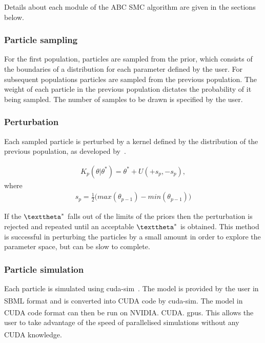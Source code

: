 \noindent Details about each module of the ABC SMC algorithm are given in the sections below. 


\subsubsection{Particle sampling}
\label{sec:part_samp}
For the first population, particles are sampled from the prior, which consists of the boundaries of a distribution for each parameter defined by the user. For subsequent populations particles are sampled from the previous population. The weight of each particle in the previous population dictates the probability of it being sampled. The number of samples to be drawn is specified by the user.  

\subsubsection{Perturbation}
\label{sec:pertub}
Each sampled particle is perturbed by a kernel defined by the distribution of the previous population, as developed by~\textcite{Toni:2009tr}. 

\begin{align}
K_p(\theta|\theta^* ) = \theta^* + U(+s_p, -s_p),
\end{align}
\noindent  where
\begin{align}
s_p = \frac{1}{2} \big (max(\theta_{p-1}) - min(\theta_{p-1}) \big )
\end{align}

\noindent If the $\texttheta^*$ falls out of the limits of the priors then the perturbation is rejected and repeated until an acceptable $\texttheta^*$ is obtained. This method is successful in perturbing the particles by a small amount in order to explore the parameter space, but can be slow to complete. 

\subsubsection{Particle simulation}
\label{sec:sim}
Each particle is simulated using cuda-sim~\autocite{Zhou:2011hp}. The model is provided by the user in SBML format and is converted into CUDA\textsuperscript{\textregistered} code by cuda-sim. The model in CUDA\textsuperscript{\textregistered} code format can then be run on NVIDIA\textsuperscript{\textregistered}. CUDA\textsuperscript{\textregistered}. \acrshort{gpu}s. This allows the user to take advantage of the speed of parallelised simulations without any CUDA\textsuperscript{\textregistered} knowledge. 


